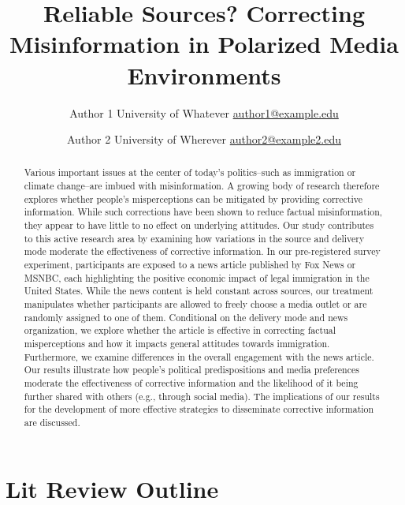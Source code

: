\documentclass[11pt,article,oneside]{memoir}
\title{\bigskip \bigskip Reliable Sources? Correcting Misinformation in
Polarized Media Environments}
\author{
      \Large Author 1 \newline
    \footnotesize University of Whatever \newline
    \footnotesize \url{author1@example.edu}\vspace*{1.1em}\newline 
     \and 
      \Large Author 2 \newline
    \footnotesize University of Wherever \newline
    \footnotesize \url{author2@example2.edu}\vspace*{1.1em}\newline 
    }
\date{}
\begin{document}
{}



\pagestyle{ath} 



\maketitle


\begin{abstract}
\noindent Various important issues at the center of today's
politics--such as immigration or climate change--are imbued with
misinformation. A growing body of research therefore explores whether
people's misperceptions can be mitigated by providing corrective
information. While such corrections have been shown to reduce factual
misinformation, they appear to have little to no effect on underlying
attitudes. Our study contributes to this active research area by
examining how variations in the source and delivery mode moderate the
effectiveness of corrective information. In our pre-registered survey
experiment, participants are exposed to a news article published by Fox
News or MSNBC, each highlighting the positive economic impact of legal
immigration in the United States. While the news content is held
constant across sources, our treatment manipulates whether participants
are allowed to freely choose a media outlet or are randomly assigned to
one of them. Conditional on the delivery mode and news organization, we
explore whether the article is effective in correcting factual
misperceptions and how it impacts general attitudes towards immigration.
Furthermore, we examine differences in the overall engagement with the
news article. Our results illustrate how people's political
predispositions and media preferences moderate the effectiveness of
corrective information and the likelihood of it being further shared
with others (e.g., through social media). The implications of our
results for the development of more effective strategies to disseminate
corrective information are discussed.
\bigskip
\end{abstract}



\hypertarget{lit-review-outline}{%
\section{Lit Review Outline}\label{lit-review-outline}}
\end{document}
